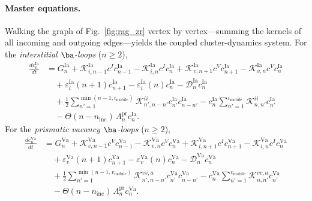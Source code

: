 \paragraph{Master equations.}
Walking the graph of Fig.~\ref{fig:rag_zr} vertex by vertex---summing
the kernels of all incoming and outgoing edges---yields the coupled
cluster-dynamics system. For the \emph{interstitial $\ba$-loops}
($n\ge2$),
\begin{align}
\frac{dc_n^{\mathrm{Ia}}}{dt}
&= G_n^{\mathrm{Ia}}
 + \mathcal{K}_{i,n-1}^{\mathrm{Ia}}c^{I}c_{n-1}^{\mathrm{Ia}}
 - \mathcal{K}_{i,n}^{\mathrm{Ia}}c^{I}c_n^{\mathrm{Ia}}
 + \mathcal{K}_{v,n+1}^{\mathrm{Ia}}c^{V}c_{n+1}^{\mathrm{Ia}}
 - \mathcal{K}_{v,n}^{\mathrm{Ia}}c^{V}c_n^{\mathrm{Ia}}
 \nonumber\\
&\quad
 + \varepsilon_i^{\mathrm{Ia}}(n{+}1)c_{n+1}^{\mathrm{Ia}}
 - \varepsilon_i^{\mathrm{Ia}}(n)c_n^{\mathrm{Ia}}
 - \mathcal{D}_n^{\mathrm{Ia}}c_n^{\mathrm{Ia}}
 \nonumber\\
&\quad
 + \tfrac12\!\!\sum_{n'=1}^{\min(n-1,i_{\mathrm{mobile}})}\!\!
     \mathcal{K}_{n',n-n'}^{ii}c_{n'}^{\mathrm{Ia}}c_{n-n'}^{\mathrm{Ia}}
 - c_n^{\mathrm{Ia}}\!\!\sum_{n'=1}^{i_{\mathrm{mobile}}}\!\!
     \mathcal{K}_{n,n'}^{ii}c_{n'}^{\mathrm{Ia}}
 \nonumber\\
&\quad
 - \Theta(n-n_{\mathrm{inc}})\,\Lambda_n^{\mathrm{pr}}c_n^{\mathrm{Ia}}.
\label{eq:ME_Ia}
\end{align}
For the \emph{prismatic vacancy $\ba$-loops} ($n\ge2$),
\begin{align}
\frac{dc_n^{\mathrm{Va}}}{dt}
&= G_n^{\mathrm{Va}}
 + \mathcal{K}_{v,n-1}^{\mathrm{Va}}c^{V}c_{n-1}^{\mathrm{Va}}
 - \mathcal{K}_{v,n}^{\mathrm{Va}}c^{V}c_n^{\mathrm{Va}}
 + \mathcal{K}_{i,n+1}^{\mathrm{Va}}c^{I}c_{n+1}^{\mathrm{Va}}
 - \mathcal{K}_{i,n}^{\mathrm{Va}}c^{I}c_n^{\mathrm{Va}}
 \nonumber\\
&\quad
 + \varepsilon_v^{\mathrm{Va}}(n{+}1)c_{n+1}^{\mathrm{Va}}
 - \varepsilon_v^{\mathrm{Va}}(n)c_n^{\mathrm{Va}}
 - \mathcal{D}_n^{\mathrm{Va}}c_n^{\mathrm{Va}}
 \nonumber\\
&\quad
 + \tfrac12\!\!\sum_{n'=1}^{\min(n-1,v_{\mathrm{mobile}})}\!\!
     \mathcal{K}_{n',n-n'}^{vv,a}c_{n'}^{\mathrm{Va}}c_{n-n'}^{\mathrm{Va}}
 - c_n^{\mathrm{Va}}\!\!\sum_{n'=1}^{v_{\mathrm{mobile}}}\!\!
     \mathcal{K}_{n,n'}^{vv,a}c_{n'}^{\mathrm{Va}}
 \nonumber\\
&\quad
 - \Theta(n-n_{\mathrm{inc}})\,\Lambda_n^{\mathrm{pr}}c_n^{\mathrm{Va}}.
\label{eq:ME_Va}
\end{align}
